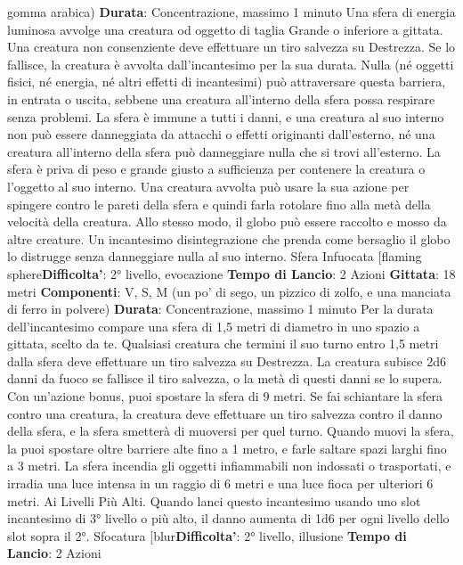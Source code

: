 \begin{multicols}{2}
gomma arabica)
\textbf{Durata}: Concentrazione, massimo 1 minuto
Una sfera di energia luminosa avvolge una creatura od
oggetto di taglia Grande o inferiore a gittata. Una
creatura non consenziente deve effettuare un tiro 
salvezza su Destrezza. Se lo fallisce, la creatura è
avvolta dall’incantesimo per la sua durata.
Nulla (né oggetti fisici, né energia, né altri effetti di
incantesimi) può attraversare questa barriera, in entrata
o uscita, sebbene una creatura all’interno della sfera
possa respirare senza problemi. La sfera è immune a
tutti i danni, e una creatura al suo interno non può
essere danneggiata da attacchi o effetti originanti
dall’esterno, né una creatura all’interno della sfera può
danneggiare nulla che si trovi all’esterno.
La sfera è priva di peso e grande giusto a sufficienza
per contenere la creatura o l’oggetto al suo interno. Una
creatura avvolta può usare la sua azione per spingere
contro le pareti della sfera e quindi farla rotolare fino
alla metà della velocità della creatura. Allo stesso
modo, il globo può essere raccolto e mosso da altre
creature.
Un incantesimo disintegrazione che prenda come
bersaglio il globo lo distrugge senza danneggiare nulla
al suo interno.
Sfera Infuocata
[flaming sphere\textbf{Difficolta'}:
2° livello, evocazione
\textbf{Tempo di Lancio}: 2 Azioni
\textbf{Gittata}: 18 metri
\textbf{Componenti}: V, S, M (un po’ di sego, un pizzico di
zolfo, e una manciata di ferro in polvere)
\textbf{Durata}: Concentrazione, massimo 1 minuto
Per la durata dell’incantesimo compare una sfera di 1,5
metri di diametro in uno spazio a gittata, scelto da te.
Qualsiasi creatura che termini il suo turno entro 1,5
metri dalla sfera deve effettuare un tiro salvezza su
Destrezza. La creatura subisce 2d6 danni da fuoco se
fallisce il tiro salvezza, o la metà di questi danni se lo
supera.
Con un’azione bonus, puoi spostare la sfera di 9 metri.
Se fai schiantare la sfera contro una creatura, la
creatura deve effettuare un tiro salvezza contro il danno
della sfera, e la sfera smetterà di muoversi per quel
turno.
Quando muovi la sfera, la puoi spostare oltre barriere
alte fino a 1 metro, e farle saltare spazi larghi fino a 3
metri. La sfera incendia gli oggetti infiammabili non
indossati o trasportati, e irradia una luce intensa in un
raggio di 6 metri e una luce fioca per ulteriori 6 metri.
Ai Livelli Più Alti. Quando lanci questo incantesimo
usando uno slot incantesimo di 3° livello o più alto, il
danno aumenta di 1d6 per ogni livello dello slot sopra il
2°.
Sfocatura
[blur\textbf{Difficolta'}:
2° livello, illusione
\textbf{Tempo di Lancio}: 2 Azioni

\end{multicols}

